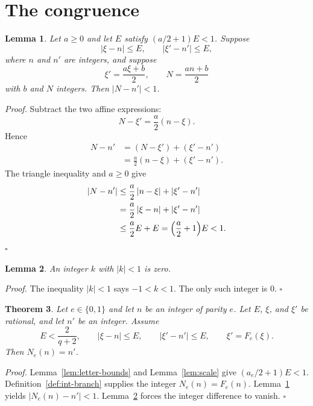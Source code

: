 \documentclass[11pt,letterpaper]{article}
\newtheorem{theorem}{Theorem}
\newtheorem{lemma}[theorem]{Lemma}
\newenvironment{proof}{\noindent\textit{Proof.}}{\hfill\(\square\)}
\begin{document}
\section{The congruence}

\begin{lemma}
\label{lem:discrepancy}
Let \(a\geq 0\) and let \(E\) satisfy \((a/2+1)E<1\). Suppose
\[
|\xi-n|\leq E,\qquad |\xi'-n'|\leq E,
\]
where \(n\) and \(n'\) are integers, and suppose
\[
\xi'=\frac{a\xi+b}{2},\qquad N=\frac{an+b}{2}
\]
with \(b\) and \(N\) integers. Then \(|N-n'|<1\).
\end{lemma}

\begin{proof}
Subtract the two affine expressions:
\[
N-\xi'=\frac{a}{2}(n-\xi).
\]
Hence
\begin{align*}
N-n'
&=(N-\xi')+(\xi'-n')\\
&=\frac{a}{2}(n-\xi)+(\xi'-n').
\end{align*}
The triangle inequality and \(a\geq 0\) give
\begin{align*}
|N-n'|
&\leq\frac{a}{2}\,|n-\xi|+|\xi'-n'|\\
&=\frac{a}{2}\,|\xi-n|+|\xi'-n'|\\
&\leq\frac{a}{2}E+E
=\Bigl(\frac{a}{2}+1\Bigr)E
<1.
\end{align*}
\end{proof}

\begin{lemma}
\label{lem:abs-one}
An integer \(k\) with \(|k|<1\) is zero.
\end{lemma}

\begin{proof}
The inequality \(|k|<1\) says \(-1<k<1\). The only such integer is \(0\).
\end{proof}

\begin{theorem}
\label{thm:congruence}
Let \(e\in\{0,1\}\) and let \(n\) be an integer of parity \(e\). Let \(E\), \(\xi\), and \(\xi'\) be rational, and let \(n'\) be an integer. Assume
\[
E<\frac{2}{q+2},\qquad
|\xi-n|\leq E,\qquad
|\xi'-n'|\leq E,\qquad
\xi'=F_e(\xi).
\]
Then \(N_e(n)=n'\).
\end{theorem}

\begin{proof}
Lemma~\ref{lem:letter-bounds} and Lemma~\ref{lem:scale} give \((a_e/2+1)E<1\). Definition~\ref{def:int-branch} supplies the integer \(N_e(n)=F_e(n)\). Lemma~\ref{lem:discrepancy} yields \(|N_e(n)-n'|<1\). Lemma~\ref{lem:abs-one} forces the integer difference to vanish.
\end{proof}
\end{document}
